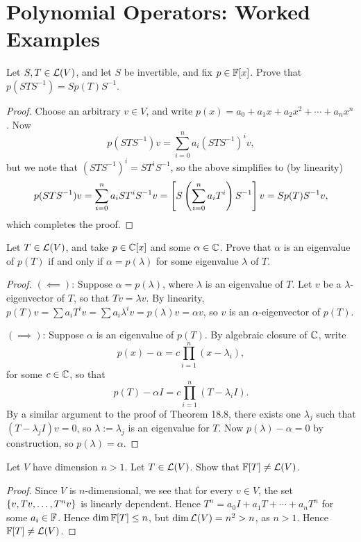 \documentclass{article}
\begin{document}
\section{Polynomial Operators: Worked Examples}
\begin{example}
Let $S,T\in\mathcal L(V)$, and let $S$ be invertible, and fix $p\in\mathbb F[x]$. Prove that $p(STS^{-1}) = Sp(T)S^{-1}$.
\end{example}
\begin{proof}
Choose an arbitrary $v\in V$, and write $p(x) = a_0 + a_1x + a_2x^2 + \cdots + a_nx^n$. Now
$$p(STS^{-1})v = \sum_{i=0}^n a_i(STS^{-1})^i v,$$
but we note that $(STS^{-1})^i = ST^iS^{-1}$, so the above simplifies to (by linearity)
$$p(STS^{-1})v = \sum_{i=0}^n a_iST^{i}S^{-1}v = \left[S\left(\sum_{i=0}^n a_iT^i \right)S^{-1}\right]v = Sp(T)S^{-1}v,$$
which completes the proof.
\end{proof}
\begin{example}
Let $T\in\mathcal L(V)$, and take $p\in\mathbb C[x]$ and some $\alpha\in\mathbb C$. Prove that $\alpha$ is an eigenvalue of $p(T)$ if and only if $\alpha = p(\lambda)$ for some eigenvalue $\lambda$ of $T$.
\end{example}
\begin{proof}
$(\impliedby)$: Suppose $\alpha = p(\lambda)$, where $\lambda$ is an eigenvalue of $T$. Let $v$ be a $\lambda$-eigenvector of $T$, so that $Tv = \lambda v$. By linearity, $p(T)v = \sum a_iT^iv = \sum a_i\lambda^i v = p(\lambda)v = \alpha v$, so $v$ is an $\alpha$-eigenvector of $p(T)$.

$(\implies)$: Suppose $\alpha$ is an eigenvalue of $p(T)$. By algebraic closure of $\mathbb C$, write
$$p(x)-\alpha = c\prod_{i=1}^n (x-\lambda_i),$$
for some $c\in\mathbb C$, so that
$$p(T) - \alpha I = c\prod_{i=1}^n (T - \lambda_iI).$$
By a similar argument to the proof of Theorem 18.8, there exists one $\lambda_j$ such that $(T-\lambda_j I)v = 0$, so $\lambda:= \lambda_j$ is an eigenvalue for $T$. Now $p(\lambda)-\alpha = 0$ by construction, so $p(\lambda) = \alpha$.
\end{proof}
\begin{example}
Let $V$ have dimension $n>1$. Let $T\in\mathcal L(V)$. Show that $\mathbb F[T] \neq\mathcal L(V)$.
\end{example}
\begin{proof}
Since $V$ is $n$-dimensional, we see that for every $v\in V$, the set $\left\{v, Tv, \ldots, T^nv\right\}$ is linearly dependent. Hence $T^n = a_0I + a_1T + \cdots + a_nT^n$ for some $a_i\in \mathbb F$. Hence $\dim \mathbb F[T] \leq n$, but $\dim \mathcal L(V) = n^2 > n$, as $n>1$. Hence $\mathbb F[T] \neq \mathcal L(V)$.
\end{proof}
\end{document}
